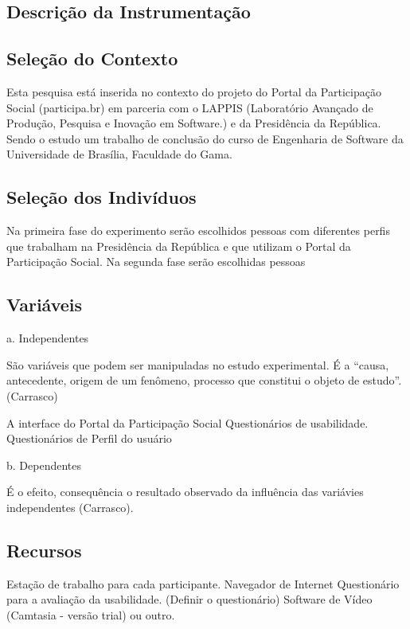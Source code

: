 \subsection{Descrição da Instrumentação}

\subsection{Seleção do Contexto}

Esta pesquisa está inserida no contexto do projeto do Portal da Participação Social (participa.br) em parceria com o LAPPIS (Laboratório Avançado de Produção, Pesquisa e Inovação em Software.) e da Presidência da República. Sendo o estudo um trabalho de conclusão do curso de Engenharia de Software da Universidade de Brasília, Faculdade do Gama.

\subsection{Seleção dos Indivíduos}

	Na primeira fase do experimento serão escolhidos pessoas com diferentes perfis que trabalham na Presidência da República e que utilizam o Portal da Participação Social.
Na segunda fase serão escolhidas pessoas 

\subsection{Variáveis}
 
a. Independentes

São variáveis que podem ser manipuladas no estudo experimental. É a “causa, antecedente, origem de um fenômeno, processo que constitui o objeto de estudo”.(Carrasco)


A interface do Portal da Participação Social
Questionários de usabilidade.
Questionários de Perfil do usuário


b. Dependentes

É o efeito, consequência o resultado observado da influência das variávies independentes (Carrasco).


\subsection{Recursos}

Estação de trabalho para cada participante.
Navegador de Internet
Questionário para a avaliação da usabilidade. (Definir o questionário)
Software de Vídeo (Camtasia - versão trial) ou outro.

